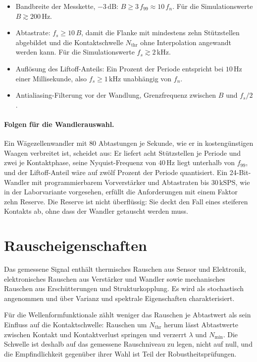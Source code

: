 \documentclass[12pt,a4paper]{report}
\begin{document}
\begin{itemize}
\item Bandbreite der Messkette, $-3\,\mathrm{dB}$:
      $B \geq 3\,f_{99} \approx 10\,f_n$. Für die Simulationswerte
      $B \gtrsim 200\,\mathrm{Hz}$.
\item Abtastrate: $f_s \geq 10\,B$, damit die Flanke mit mindestens zehn
      Stützstellen abgebildet und die Kontaktschwelle $N_{\mathrm{thr}}$
      ohne Interpolation angewandt werden kann. Für die Simulationswerte
      $f_s \gtrsim 2\,\mathrm{kHz}$.
\item Auflösung des Liftoff-Anteils: Ein Prozent der Periode entspricht
      bei $10\,\mathrm{Hz}$ einer Millisekunde, also $f_s \geq 1\,\mathrm{kHz}$
      unabhängig von $f_n$.
\item Antialiasing-Filterung vor der Wandlung, Grenzfrequenz zwischen
      $B$ und $f_s/2$.
\end{itemize}

\paragraph{Folgen für die Wandlerauswahl.}
Ein Wägezellenwandler mit $80$ Abtastungen je Sekunde, wie er in
kostengünstigen Waagen verbreitet ist, scheidet aus: Er liefert acht
Stützstellen je Periode und zwei je Kontaktphase, seine Nyquist-Frequenz
von $40\,\mathrm{Hz}$ liegt unterhalb von $f_{99}$, und der
Liftoff-Anteil wäre auf zwölf Prozent der Periode quantisiert. Ein
24-Bit-Wandler mit programmierbarem Vorverstärker und Abtastraten bis
$30\,\mathrm{kSPS}$, wie in der Laborvariante vorgesehen, erfüllt die
Anforderungen mit einem Faktor zehn Reserve. Die Reserve ist nicht
überflüssig: Sie deckt den Fall eines steiferen Kontakts ab, ohne dass
der Wandler getauscht werden muss.

\section{Rauscheigenschaften}

Das gemessene Signal enthält thermisches Rauschen aus Sensor und
Elektronik, elektronisches Rauschen aus Verstärker und Wandler sowie
mechanisches Rauschen aus Erschütterungen und Strukturkopplung. Es wird
als stochastisch angenommen und über Varianz und spektrale Eigenschaften
charakterisiert.

Für die Wellenformfunktionale zählt weniger das Rauschen je Abtastwert
als sein Einfluss auf die Kontaktschwelle: Rauschen um $N_{\mathrm{thr}}$
herum lässt Abtastwerte zwischen Kontakt und Kontaktverlust springen und
verzerrt $\lambda$ und $N_{\min}$. Die Schwelle ist deshalb auf das
gemessene Rauschniveau zu legen, nicht auf null, und die Empfindlichkeit
gegenüber ihrer Wahl ist Teil der Robustheitsprüfungen.
\end{document}
